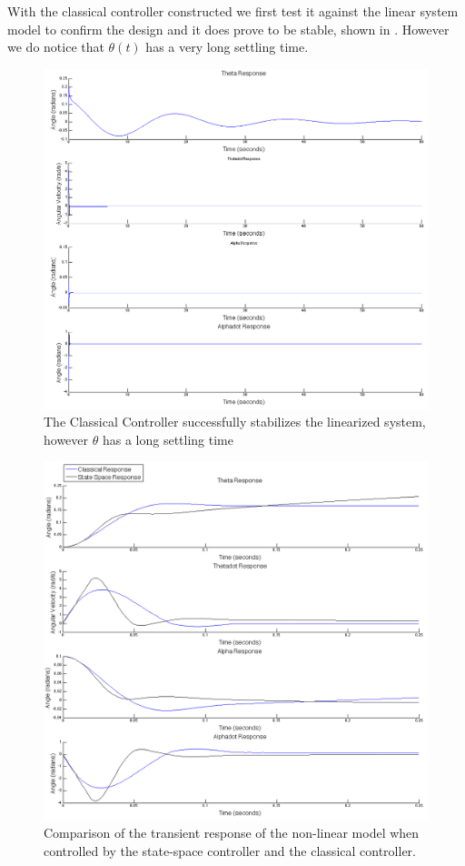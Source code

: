 \documentclass{article}
\theoremstyle{plain}
\theoremstyle{definition}
\theoremstyle{remark}
\begin{document}
With the classical controller constructed we first test it against the linear system model to confirm the design and it does prove to be stable, shown in .  However we do notice that $\theta(t)$ has a very long settling time.  
\begin{figure}
\begin{center}
\includegraphics[width = 15cm]{classicalLinearModel.png}
\end{center}
\caption{The Classical Controller successfully stabilizes the linearized system, however $\theta$ has a long settling time}
\label{ClassicalLinearModel}
\end{figure}

\begin{figure}
\begin{center}
\includegraphics[width = 15cm]{transientNonLinear}
\end{center}
\caption{Comparison of the transient response of the non-linear model when controlled by the state-space controller and the classical controller.}
\label{q8classicalvsStateSpace}
\end{figure}
\end{document}
